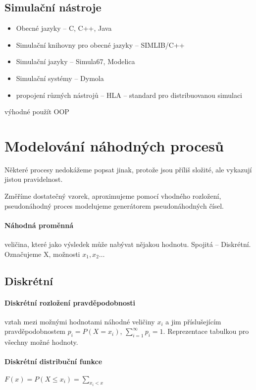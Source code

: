 \documentclass[a4wide]{report}
\begin{document}
\subsection{Simulační nástroje}
\begin{itemize}
	\item Obecné jazyky -- C, C++, Java
	\item Simulační knihovny pro obecné jazyky -- SIMLIB/C++
	\item Simulační jazyky -- Simula67, Modelica
	\item Simulační systémy -- Dymola
	\item propojení různých nástrojů -- HLA -- standard pro distribuovanou simulaci
\end{itemize}
výhodné použít OOP

\section{Modelování náhodných procesů}

Některé procesy nedokážeme popsat jinak, protože jsou příliš složité, ale vykazují jistou pravidelnost.

Změříme dostatečný vzorek, aproximujeme pomocí vhodného rozložení, pseudonáhodný proces modelujeme generátorem pseudonáhodných čísel.

\paragraph{Náhodná proměnná}
veličina, které jako výsledek může nabývat nějakou hodnotu. Spojitá -- Diskrétní. Označujeme X, možnosti $x_1, x_2 \dots$

\subsection{Diskrétní}

\paragraph{Diskrétní rozložení pravděpodobnosti}
vztah mezi možnými hodnotami náhodné veličiny $x_i$ a jim příslušejícím pravděpodobnostem $p_i = P(X = x_i)$, $\sum_{i = 1}^\infty p_i = 1$. Reprezentace tabulkou pro všechny možné hodnoty.

\paragraph{Diskrétní distribuční funkce}
$F(x) = P(X \leq x_i) = \sum_{x_i < x}$
\end{document}
